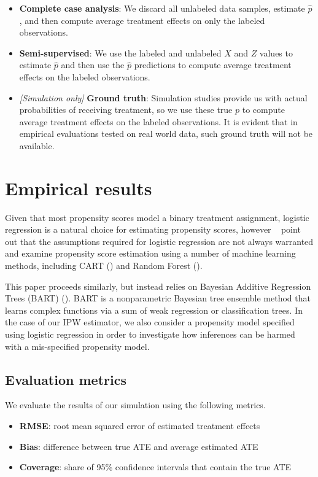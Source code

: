 \documentclass[aos]{imsart}
\begin{document}
\begin{itemize}
\item \textbf{Complete case analysis}: We discard all unlabeled data samples, estimate $\hat{p}$, and then compute average treatment effects on only the labeled observations.
\item \textbf{Semi-supervised}: We use the labeled and unlabeled $X$ and $Z$ values to estimate $\hat{p}$ and then use the $\hat{p}$ predictions to compute average treatment effects on the labeled observations.
\item \textit{[Simulation only]} \textbf{Ground truth}: Simulation studies provide us with actual probabilities of receiving treatment, so we use these true $p$ to compute average treatment effects on the labeled observations. It is evident that in empirical evaluations tested on real world data, such ground truth will not be available.
\end{itemize}

\section{Empirical results}

Given that most propensity scores model a binary treatment assignment, logistic regression is a natural choice for 
estimating propensity scores, however ~\cite{lee2010improving} point out that the assumptions required for logistic 
regression are not always warranted and examine propensity score estimation using a number of machine learning 
methods, including CART (\cite{breiman1984classification}) and Random Forest (\cite{breiman2001random}).

This paper proceeds similarly, but instead relies on Bayesian Additive Regression Trees (BART) (\cite{chipman2010bart}). 
BART is a nonparametric Bayesian tree ensemble method that learns complex functions via a sum of weak regression 
or classification trees. In the case of our IPW estimator, we also consider a propensity model specified using logistic regression in order to investigate how inferences can be harmed with a mis-specified propensity model.

\subsection{Evaluation metrics}

We evaluate the results of our simulation using the following metrics.

\begin{itemize}
	\item \textbf{RMSE}: root mean squared error of estimated treatment effects
	\item \textbf{Bias}: difference between true ATE and average estimated ATE
	\item \textbf{Coverage}: share of 95\% confidence intervals that contain the true ATE
\end{itemize}
\end{document}

